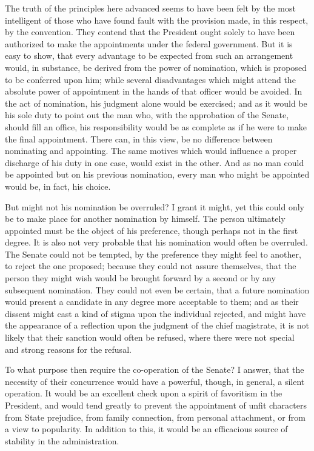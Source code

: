 The truth of the principles here advanced seems to have been felt by the most intelligent of those who have found fault with the provision made, in this respect, by the convention. 
They contend that the President ought solely to have been authorized to make the appointments under the federal government. 
But it is easy to show, that every advantage to be expected from such an arrangement would, in substance, be derived from the power of nomination, which is proposed to be conferred upon him; while several disadvantages which might attend the absolute power of appointment in the hands of that officer would be avoided. 
In the act of nomination, his judgment alone would be exercised; and as it would be his sole duty to point out the man who, with the approbation of the Senate, should fill an office, his responsibility would be as complete as if he were to make the final appointment. 
There can, in this view, be no difference between nominating and appointing. 
The same motives which would influence a proper discharge of his duty in one case, would exist in the other. 
And as no man could be appointed but on his previous nomination, every man who might be appointed would be, in fact, his choice.

But might not his nomination be overruled? 
I grant it might, yet this could only be to make place for another nomination by himself. 
The person ultimately appointed must be the object of his preference, though perhaps not in the first degree. 
It is also not very probable that his nomination would often be overruled. 
The Senate could not be tempted, by the preference they might feel to another, to reject the one proposed; because they could not assure themselves, that the person they might wish would be brought forward by a second or by any subsequent nomination. 
They could not even be certain, that a future nomination would present a candidate in any degree more acceptable to them; and as their dissent might cast a kind of stigma upon the individual rejected, and might have the appearance of a reflection upon the judgment of the chief magistrate, it is not likely that their sanction would often be refused, where there were not special and strong reasons for the refusal.

To what purpose then require the co-operation of the Senate? 
I answer, that the necessity of their concurrence would have a powerful, though, in general, a silent operation. 
It would be an excellent check upon a spirit of favoritism in the President, and would tend greatly to prevent the appointment of unfit characters from State prejudice, from family connection, from personal attachment, or from a view to popularity. 
In addition to this, it would be an efficacious source of stability in the administration.

